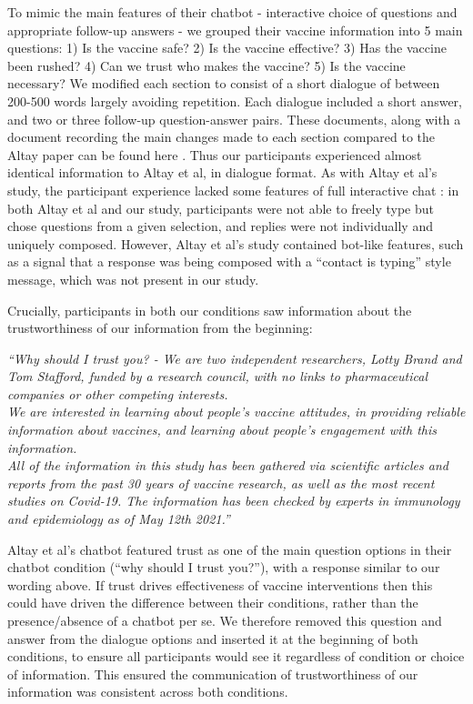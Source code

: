 \documentclass[
  english,
  ,jou,floatsintext]{apa6}
\begin{document}
To mimic the main features of their chatbot - interactive choice of questions and appropriate follow-up answers - we grouped their vaccine information into 5 main questions: 1) Is the vaccine safe? 2) Is the vaccine effective? 3) Has the vaccine been rushed? 4) Can we trust who makes the vaccine? 5) Is the vaccine necessary? We modified each section to consist of a short dialogue of between 200-500 words largely avoiding repetition. Each dialogue included a short answer, and two or three follow-up question-answer pairs. These documents, along with a document recording the main changes made to each section compared to the Altay paper can be found here . Thus our participants experienced almost identical information to Altay et al, in dialogue format. As with Altay et al's study, the participant experience lacked some features of full interactive chat : in both Altay et al and our study, participants were not able to freely type but chose questions from a given selection, and replies were not individually and uniquely composed. However, Altay et al's study contained bot-like features, such as a signal that a response was being composed with a ``contact is typing'' style message, which was not present in our study.

Crucially, participants in both our conditions saw information about the trustworthiness of our information from the beginning:

\emph{``Why should I trust you? - We are two independent researchers, Lotty Brand and Tom Stafford, funded by a research council, with no links to pharmaceutical companies or other competing interests. }\\
\emph{We are interested in learning about people's vaccine attitudes, in providing reliable information about vaccines, and learning about people's engagement with this information. }\\
\emph{All of the information in this study has been gathered via scientific articles and reports from the past 30 years of vaccine research, as well as the most recent studies on Covid-19. The information has been checked by experts in immunology and epidemiology as of May 12th 2021.''}

Altay et al's chatbot featured trust as one of the main question options in their chatbot condition (``why should I trust you?''), with a response similar to our wording above. If trust drives effectiveness of vaccine interventions then this could have driven the difference between their conditions, rather than the presence/absence of a chatbot per se. We therefore removed this question and answer from the dialogue options and inserted it at the beginning of both conditions, to ensure all participants would see it regardless of condition or choice of information. This ensured the communication of trustworthiness of our information was consistent across both conditions.
\end{document}
